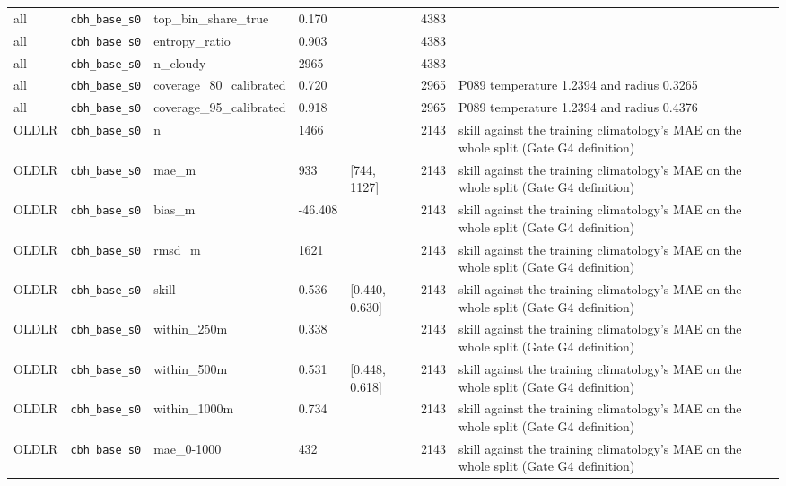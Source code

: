 \begin{center}
{\begin{tabular}{lp{2.4cm}llllp{7.3cm}}
all & \texttt{cbh\_\allowbreak{}base\_\allowbreak{}s0} & top\_bin\_share\_true & 0.170 &  & 4383 &  \\
all & \texttt{cbh\_\allowbreak{}base\_\allowbreak{}s0} & entropy\_ratio & 0.903 &  & 4383 &  \\
all & \texttt{cbh\_\allowbreak{}base\_\allowbreak{}s0} & n\_cloudy & 2965 &  & 4383 &  \\
all & \texttt{cbh\_\allowbreak{}base\_\allowbreak{}s0} & coverage\_80\_calibrated & 0.720 &  & 2965 & P089 temperature 1.2394 and radius 0.3265 \\
all & \texttt{cbh\_\allowbreak{}base\_\allowbreak{}s0} & coverage\_95\_calibrated & 0.918 &  & 2965 & P089 temperature 1.2394 and radius 0.4376 \\
OLDLR & \texttt{cbh\_\allowbreak{}base\_\allowbreak{}s0} & n & 1466 &  & 2143 & skill against the training climatology's MAE on the whole split (Gate G4 definition) \\
OLDLR & \texttt{cbh\_\allowbreak{}base\_\allowbreak{}s0} & mae\_m & 933 & [744, 1127] & 2143 & skill against the training climatology's MAE on the whole split (Gate G4 definition) \\
OLDLR & \texttt{cbh\_\allowbreak{}base\_\allowbreak{}s0} & bias\_m & -46.408 &  & 2143 & skill against the training climatology's MAE on the whole split (Gate G4 definition) \\
OLDLR & \texttt{cbh\_\allowbreak{}base\_\allowbreak{}s0} & rmsd\_m & 1621 &  & 2143 & skill against the training climatology's MAE on the whole split (Gate G4 definition) \\
OLDLR & \texttt{cbh\_\allowbreak{}base\_\allowbreak{}s0} & skill & 0.536 & [0.440, 0.630] & 2143 & skill against the training climatology's MAE on the whole split (Gate G4 definition) \\
OLDLR & \texttt{cbh\_\allowbreak{}base\_\allowbreak{}s0} & within\_250m & 0.338 &  & 2143 & skill against the training climatology's MAE on the whole split (Gate G4 definition) \\
OLDLR & \texttt{cbh\_\allowbreak{}base\_\allowbreak{}s0} & within\_500m & 0.531 & [0.448, 0.618] & 2143 & skill against the training climatology's MAE on the whole split (Gate G4 definition) \\
OLDLR & \texttt{cbh\_\allowbreak{}base\_\allowbreak{}s0} & within\_1000m & 0.734 &  & 2143 & skill against the training climatology's MAE on the whole split (Gate G4 definition) \\
OLDLR & \texttt{cbh\_\allowbreak{}base\_\allowbreak{}s0} & mae\_0-1000 & 432 &  & 2143 & skill against the training climatology's MAE on the whole split (Gate G4 definition) \\

\end{tabular}}
\end{center}
